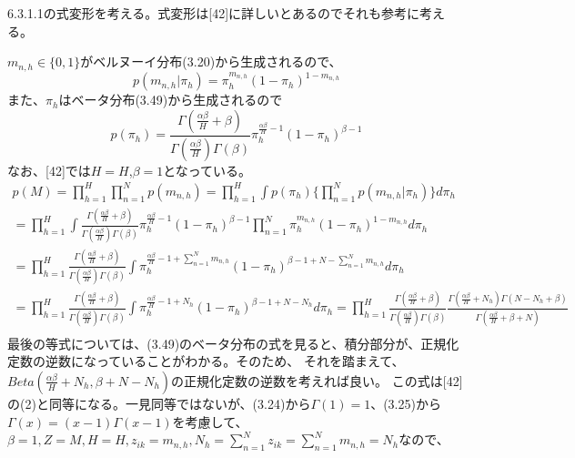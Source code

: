﻿\documentclass{jsarticle}
\begin{document}
6.3.1.1の式変形を考える。式変形は[42]に詳しいとあるのでそれも参考に考える。

$m_{n, h} \in \{0, 1\}$がベルヌーイ分布(3.20)から生成されるので、
\begin{equation}
p(m_{n, h} | \pi_h) = \pi_h^{m_{n, h}}(1 - \pi_h)^{1 - m_{n, h}}
\end{equation}
また、$\pi_h$はベータ分布(3.49)から生成されるので
\begin{equation}
p(\pi_h) = \frac{\Gamma(\frac{\alpha\beta}{H} + \beta)}{\Gamma(\frac{\alpha\beta}{H})\Gamma(\beta)}\pi_h^{\frac{\alpha\beta}{H} - 1}(1 - \pi_h)^{\beta - 1}
\end{equation}
なお、[42]では$H = H$,$\beta = 1$となっている。
\begin{equation}
\begin{split}
p(M) = \prod_{h=1}^H \prod_{n=1}^N p(m_{n, h})  = \prod_{h=1}^H \int p(\pi_h) \{ \prod_{n=1}^N p(m_{n, h} | \pi_h)\} d \pi_h\\
= \prod_{h=1}^H \int \frac{\Gamma(\frac{\alpha\beta}{H} + \beta)}{\Gamma(\frac{\alpha\beta}{H})\Gamma(\beta)}\pi_h^{\frac{\alpha\beta}{H} - 1}(1 - \pi_h)^{\beta - 1} \prod_{n=1}^N \pi_h^{m_{n, h}}(1 - \pi_h)^{1 - m_{n, h}} d \pi_h\\
= \prod_{h=1}^H \frac{\Gamma(\frac{\alpha\beta}{H} + \beta)}{\Gamma(\frac{\alpha\beta}{H})\Gamma(\beta)} \int \pi_h^{\frac{\alpha\beta}{H} - 1 + \sum_{n = 1}^N m_{n, h}}(1 - \pi_h)^{\beta - 1 + N - \sum_{n = 1}^N m_{n, h}}d \pi_h\\
= \prod_{h=1}^H \frac{\Gamma(\frac{\alpha\beta}{H} + \beta)}{\Gamma(\frac{\alpha\beta}{H})\Gamma(\beta)} \int \pi_h^{\frac{\alpha\beta}{H} - 1 + N_h}(1 - \pi_h)^{\beta - 1 + N - N_h}d \pi_h
= \prod_{h=1}^H \frac{\Gamma(\frac{\alpha\beta}{H} + \beta)}{\Gamma(\frac{\alpha\beta}{H})\Gamma(\beta)}\frac{\Gamma(\frac{\alpha\beta}{H} + N_h)\Gamma(N - N_h + \beta)}{\Gamma(\frac{\alpha\beta}{H} + \beta + N)}\\
\end{split}
\end{equation}
最後の等式については、(3.49)のベータ分布の式を見ると、積分部分が、正規化定数の逆数になっていることがわかる。そのため、
それを踏まえて、$Beta(\frac{\alpha\beta}{H} + N_h, \beta + N - N_h)$の正規化定数の逆数を考えれば良い。
この式は[42]の(2)と同等になる。一見同等ではないが、(3.24)から$\Gamma(1) = 1$、(3.25)から$\Gamma(x) = (x - 1)\Gamma(x - 1)$を考慮して、$\beta = 1, Z = M, H = H, z_{ik} = m_{n, h}, N_h = \sum_{n=1}^N z_{ik} = \sum_{n=1}^N m_{n, h} = N_h$なので、
\end{document}
